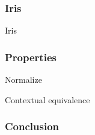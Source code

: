 \documentclass[xcolor={usenames,dvipsnames}]{beamer}
\begin{document}
\begin{frame}
  \frametitle{Iris}
  \begin{block}{Iris}
  \end{block}

\end{frame}

\begin{frame}
  \frametitle{Properties}
  \begin{block}{Normalize}
  \end{block}

  \begin{block}{Contextual equivalence}
  \end{block}
\end{frame}

\begin{frame}
  \frametitle{Conclusion}
\end{frame}
\end{document}
